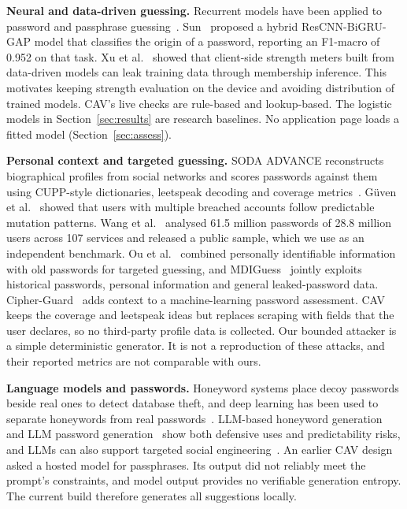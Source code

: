 \documentclass[conference]{IEEEtran}
\begin{document}
\textbf{Neural and data-driven guessing.} Recurrent models have been applied to password and passphrase guessing~\cite{nosenko}. Sun~\cite{sun} proposed a hybrid ResCNN-BiGRU-GAP model that classifies the origin of a password, reporting an F1-macro of 0.952 on that task. Xu et al.~\cite{xu} showed that client-side strength meters built from data-driven models can leak training data through membership inference. This motivates keeping strength evaluation on the device and avoiding distribution of trained models. CAV's live checks are rule-based and lookup-based. The logistic models in Section~\ref{sec:results} are research baselines. No application page loads a fitted model (Section~\ref{sec:assess}).

\textbf{Personal context and targeted guessing.} SODA ADVANCE reconstructs biographical profiles from social networks and scores passwords against them using CUPP-style dictionaries, leetspeak decoding and coverage metrics~\cite{atzori2024,atzori2025}. G\"uven et al.~\cite{guven} showed that users with multiple breached accounts follow predictable mutation patterns. Wang et al.~\cite{pass} analysed 61.5 million passwords of 28.8 million users across 107 services and released a public sample, which we use as an independent benchmark. Ou et al.~\cite{ou2026} combined personally identifiable information with old passwords for targeted guessing, and MDIGuess~\cite{mdiguess} jointly exploits historical passwords, personal information and general leaked-password data. Cipher-Guard~\cite{alatawi} adds context to a machine-learning password assessment. CAV keeps the coverage and leetspeak ideas but replaces scraping with fields that the user declares, so no third-party profile data is collected. Our bounded attacker is a simple deterministic generator. It is not a reproduction of these attacks, and their reported metrics are not comparable with ours.

\textbf{Language models and passwords.} Honeyword systems place decoy passwords beside real ones to detect database theft, and deep learning has been used to separate honeywords from real passwords~\cite{dani}. LLM-based honeyword generation~\cite{umejiaku2025} and LLM password generation~\cite{kagnici} show both defensive uses and predictability risks, and LLMs can also support targeted social engineering~\cite{sai}. An earlier CAV design asked a hosted model for passphrases. Its output did not reliably meet the prompt's constraints, and model output provides no verifiable generation entropy. The current build therefore generates all suggestions locally.
\end{document}
